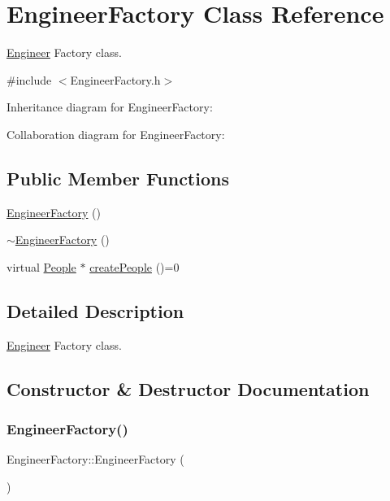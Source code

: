 \hypertarget{classEngineerFactory}{}\section{Engineer\+Factory Class Reference}
\label{classEngineerFactory}


\hyperlink{classEngineer}{Engineer} Factory class.  




{\ttfamily \#include $<$Engineer\+Factory.\+h$>$}



Inheritance diagram for Engineer\+Factory\+:


Collaboration diagram for Engineer\+Factory\+:
\subsection*{Public Member Functions}
\begin{DoxyCompactItemize}
\item 
\hyperlink{classEngineerFactory_a71b5abb3e85ebe5f78eaafc388d0ed2d}{Engineer\+Factory} ()
\item 
\hyperlink{classEngineerFactory_af892e0d4b047414dbcefee0bbe943208}{$\sim$\+Engineer\+Factory} ()
\item 
virtual \hyperlink{classPeople}{People} $\ast$ \hyperlink{classEngineerFactory_ad2ceb4fb6155ca3ad46934208195a8f3}{create\+People} ()=0
\end{DoxyCompactItemize}


\subsection{Detailed Description}
\hyperlink{classEngineer}{Engineer} Factory class. 

\subsection{Constructor \& Destructor Documentation}
\mbox{\label{classEngineerFactory_a71b5abb3e85ebe5f78eaafc388d0ed2d}} 
\subsubsection{\texorpdfstring{Engineer\+Factory()}{EngineerFactory()}}
{\footnotesize\ttfamily Engineer\+Factory\+::\+Engineer\+Factory (\begin{DoxyParamCaption}{ }\end{DoxyParamCaption})}

